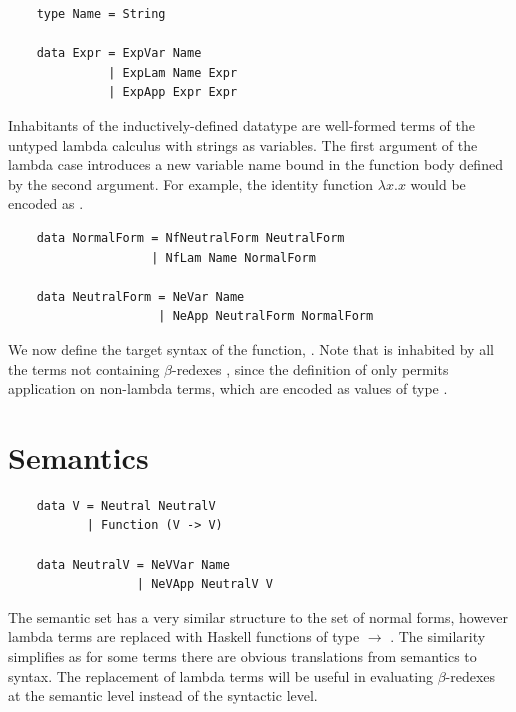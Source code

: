 \begin{lstlisting}
    type Name = String

    data Expr = ExpVar Name
              | ExpLam Name Expr
              | ExpApp Expr Expr
\end{lstlisting}

Inhabitants of the inductively-defined datatype  are well-formed terms of the untyped lambda calculus with strings as variables. The first argument of the lambda case introduces a new variable name bound in the function body defined by the second argument. For example, the identity function $\lambda x . x$ would be encoded as .

\begin{lstlisting}
    data NormalForm = NfNeutralForm NeutralForm
                    | NfLam Name NormalForm

    data NeutralForm = NeVar Name
                     | NeApp NeutralForm NormalForm
\end{lstlisting}

We now define the target syntax of the  function, . Note that  is inhabited by all the terms not containing $\beta$-redexes \cite{slides}, since the definition of  only permits application on non-lambda terms, which are encoded as values of type .

\section{Semantics}

\begin{lstlisting}
    data V = Neutral NeutralV
           | Function (V -> V)

    data NeutralV = NeVVar Name
                  | NeVApp NeutralV V
\end{lstlisting}


The semantic set  has a very similar structure to the set of normal forms, however lambda terms are replaced with Haskell functions of type  $\rightarrow$ .
The similarity simplifies  as for some terms there are obvious translations from semantics to syntax. The replacement of lambda terms will be useful in evaluating $\beta$-redexes at the semantic level instead of the syntactic level. 

